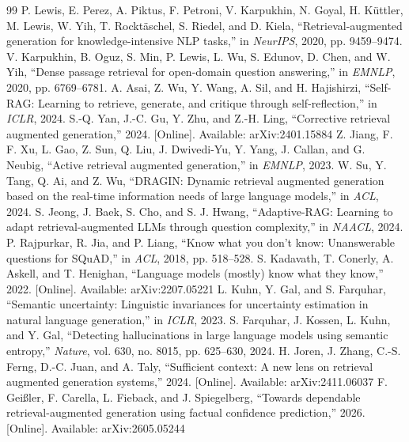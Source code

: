 \documentclass[preprint,3p,times]{elsarticle}
\begin{document}
\begin{thebibliography}{99}
 P. Lewis, E. Perez, A. Piktus, F. Petroni, V. Karpukhin, N. Goyal, H. K\"uttler, M. Lewis, W. Yih, T. Rockt\"aschel, S. Riedel, and D. Kiela, ``Retrieval-augmented generation for knowledge-intensive NLP tasks,'' in \emph{NeurIPS}, 2020, pp. 9459--9474.
 V. Karpukhin, B. Oguz, S. Min, P. Lewis, L. Wu, S. Edunov, D. Chen, and W. Yih, ``Dense passage retrieval for open-domain question answering,'' in \emph{EMNLP}, 2020, pp. 6769--6781.
 A. Asai, Z. Wu, Y. Wang, A. Sil, and H. Hajishirzi, ``Self-RAG: Learning to retrieve, generate, and critique through self-reflection,'' in \emph{ICLR}, 2024.
 S.-Q. Yan, J.-C. Gu, Y. Zhu, and Z.-H. Ling, ``Corrective retrieval augmented generation,'' 2024. [Online]. Available: arXiv:2401.15884
 Z. Jiang, F. F. Xu, L. Gao, Z. Sun, Q. Liu, J. Dwivedi-Yu, Y. Yang, J. Callan, and G. Neubig, ``Active retrieval augmented generation,'' in \emph{EMNLP}, 2023.
 W. Su, Y. Tang, Q. Ai, and Z. Wu, ``DRAGIN: Dynamic retrieval augmented generation based on the real-time information needs of large language models,'' in \emph{ACL}, 2024.
 S. Jeong, J. Baek, S. Cho, and S. J. Hwang, ``Adaptive-RAG: Learning to adapt retrieval-augmented LLMs through question complexity,'' in \emph{NAACL}, 2024.
 P. Rajpurkar, R. Jia, and P. Liang, ``Know what you don't know: Unanswerable questions for SQuAD,'' in \emph{ACL}, 2018, pp. 518--528.
 S. Kadavath, T. Conerly, A. Askell, and T. Henighan, ``Language models (mostly) know what they know,'' 2022. [Online]. Available: arXiv:2207.05221
 L. Kuhn, Y. Gal, and S. Farquhar, ``Semantic uncertainty: Linguistic invariances for uncertainty estimation in natural language generation,'' in \emph{ICLR}, 2023.
 S. Farquhar, J. Kossen, L. Kuhn, and Y. Gal, ``Detecting hallucinations in large language models using semantic entropy,'' \emph{Nature}, vol. 630, no. 8015, pp. 625--630, 2024.
 H. Joren, J. Zhang, C.-S. Ferng, D.-C. Juan, and A. Taly, ``Sufficient context: A new lens on retrieval augmented generation systems,'' 2024. [Online]. Available: arXiv:2411.06037
 F. Gei{\ss}ler, F. Carella, L. Fieback, and J. Spiegelberg, ``Towards dependable retrieval-augmented generation using factual confidence prediction,'' 2026. [Online]. Available: arXiv:2605.05244

\end{thebibliography}
\end{document}
